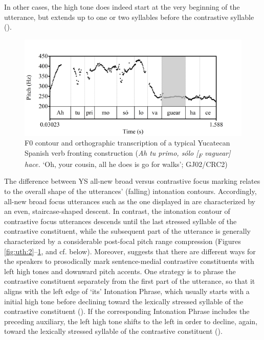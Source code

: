 \documentclass[output=paper]{langsci/langscibook}
\begin{document}
In other cases, the high tone does indeed start at the very beginning of the utterance, but extends up to one or two syllables before the contrastive syllable (). 

\begin{figure}
\includegraphics[width=\textwidth]{figures/UTH-img26.png}
 \caption{F0 contour and orthographic transcription of a typical Yucatecan Spanish verb fronting construction 
 (\textit{Ah tu primo, sólo [\textsubscript{F}} \textit{vaguear] hace.}
 ‘Oh, your cousin, all he does is go for walks’; GJ02/CRC2)}
\label{fig:uth:4}
\end{figure}

The difference between YS all-new broad versus contrastive focus marking relates to the overall shape of the utterances' (falling) intonation contours. Accordingly, all-new broad focus utterances such as the one displayed in  are characterized by an even, staircase-shaped descent. In contrast, the intonation contour of contrastive focus utterances descends until the last stressed syllable of the contrastive constituent, while the subsequent part of the utterance is generally characterized by a considerable post-focal pitch range compression (Figures \ref{fig:uth:2}--\ref{fig:uth:4}, and cf. below). Moreover, \citet{Uth16} suggests that there are different ways for the speakers to prosodically mark sentence-medial contrastive constituents with left high tones and downward pitch accents. One strategy is to phrase the contrastive constituent separately from the first part of the utterance, so that it aligns with the left edge of ‘its' Intonation Phrase, which usually starts with a initial high tone before declining toward the lexically stressed syllable of the contrastive constituent (). If the corresponding Intonation Phrase includes the preceding auxiliary, the left high tone shifts to the left in order to decline, again, toward the lexically stressed syllable of the contrastive constituent ().
 
\end{document}
